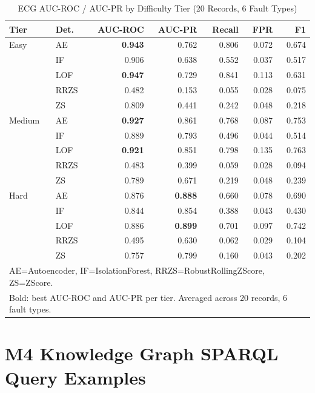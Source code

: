 \documentclass[conference]{IEEEtran}
\begin{document}
\begin{table}[h]
\caption{ECG AUC-ROC / AUC-PR by Difficulty Tier (20 Records, 6 Fault Types)}
\label{tab:tier}
\centering
\scriptsize
\setlength{\tabcolsep}{2.5pt}
\begin{tabular}{@{}llrrrrr@{}}
\toprule
\textbf{Tier} & \textbf{Det.} & \textbf{AUC-ROC} & \textbf{AUC-PR} & \textbf{Recall} & \textbf{FPR} & \textbf{F1} \\
\midrule
Easy   & AE   & \textbf{0.943} & 0.762 & 0.806 & 0.072 & 0.674 \\
       & IF   & 0.906 & 0.638 & 0.552 & 0.037 & 0.517 \\
       & LOF  & \textbf{0.947} & 0.729 & 0.841 & 0.113 & 0.631 \\
       & RRZS & 0.482 & 0.153 & 0.055 & 0.028 & 0.075 \\
       & ZS   & 0.809 & 0.441 & 0.242 & 0.048 & 0.218 \\
\midrule
Medium & AE   & \textbf{0.927} & 0.861 & 0.768 & 0.087 & 0.753 \\
       & IF   & 0.889 & 0.793 & 0.496 & 0.044 & 0.514 \\
       & LOF  & \textbf{0.921} & 0.851 & 0.798 & 0.135 & 0.763 \\
       & RRZS & 0.483 & 0.399 & 0.059 & 0.028 & 0.094 \\
       & ZS   & 0.789 & 0.671 & 0.219 & 0.048 & 0.239 \\
\midrule
Hard   & AE   & 0.876 & \textbf{0.888} & 0.660 & 0.078 & 0.690 \\
       & IF   & 0.844 & 0.854 & 0.388 & 0.043 & 0.430 \\
       & LOF  & 0.886 & \textbf{0.899} & 0.701 & 0.097 & 0.742 \\
       & RRZS & 0.495 & 0.630 & 0.062 & 0.029 & 0.104 \\
       & ZS   & 0.757 & 0.799 & 0.160 & 0.043 & 0.202 \\
\bottomrule
\multicolumn{7}{l}{\scriptsize AE=Autoencoder, IF=IsolationForest, RRZS=RobustRollingZScore, ZS=ZScore.} \\
\multicolumn{7}{l}{\scriptsize Bold: best AUC-ROC and AUC-PR per tier. Averaged across 20 records, 6 fault types.}
\end{tabular}
\end{table}

\section{M4 Knowledge Graph SPARQL Query Examples}
\label{app:sparql}
\end{document}

